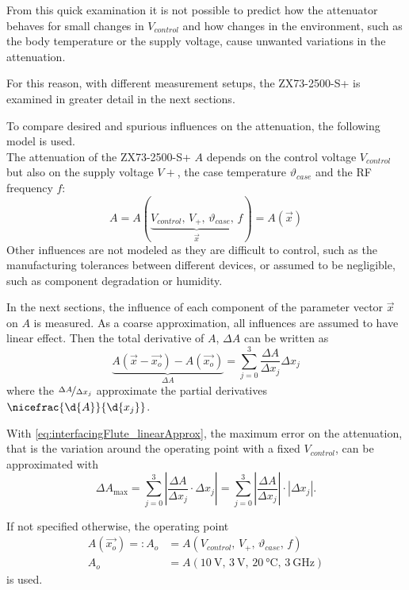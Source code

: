 From this quick examination it is not possible to predict how the attenuator behaves for small changes in $V_{control}$ and how changes in the environment, such as the body temperature or the supply voltage, cause unwanted variations in the attenuation. 

For this reason, with different measurement setups, the ZX73-2500-S+ is examined in greater detail in the next sections.

To compare desired and spurious influences on the attenuation, the following model is used.\\
The attenuation of the ZX73-2500-S+ $A$ depends on the control voltage $V_{control}$ but also on the supply voltage $V+$, the case temperature $\vartheta_{case}$ and the RF frequency $f$:
\begin{equation}
A=A(\underbrace{V_{control},\,V_+,\,\vartheta_{case},\,f}_{\vec{x}}) = A\left(\vec{x}\right)
\end{equation}
Other influences are not modeled as they are difficult to control, such as the manufacturing tolerances between different devices, or assumed to be negligible, such as component degradation or humidity.

In the next sections, the influence of each component of the parameter vector $\vec{x}$ on $A$ is measured. As a coarse approximation, all influences are assumed to have linear effect. Then the total derivative of $A$, $\Delta A$ can be written as
\begin{equation}\label{eq:interfacingFlute_linearApprox}
\underbrace{A(\vec{x}-\vec{x_o})-A(\vec{x_o})}_{\Delta A} = \sum_{j=0}^{3} \frac{\Delta A}{\Delta x_j} \Delta x_j
\end{equation}
where the $\nicefrac{\Delta A}{\Delta x_j}$ approximate the partial derivatives $\nicefrac{\d{A}}{\d{x_j}}$.

With \autoref{eq:interfacingFlute_linearApprox}, the maximum error on the attenuation, that is the variation around the operating point with a fixed $V_{control}$, can be approximated with
\begin{equation}\label{eq:interfacingFlute_maxerror}
\Delta A_{\text{max}} = \sum_{j=0}^{3} \left|\frac{\Delta A}{\Delta x_j} \cdot \Delta x_j\right| 
= \sum_{j=0}^{3} \left|\frac{\Delta A}{\Delta x_j}\right| \cdot \left|\Delta x_j\right|.
\end{equation}

If not specified otherwise, the operating point
\begin{align}\label{eq:interfacingFlute_operatingpoint}
A(\vec{x_o}) =: A_o &= A(V_{control},\,V_+,\,\vartheta_{case},\,f)\\
A_o                 &= A\left(\SI{10}{\volt},\,\SI{3}{\volt},\,\SI{20}{\celsius},\,\SI{3}{\GHz}\right)
\end{align}
is used.

